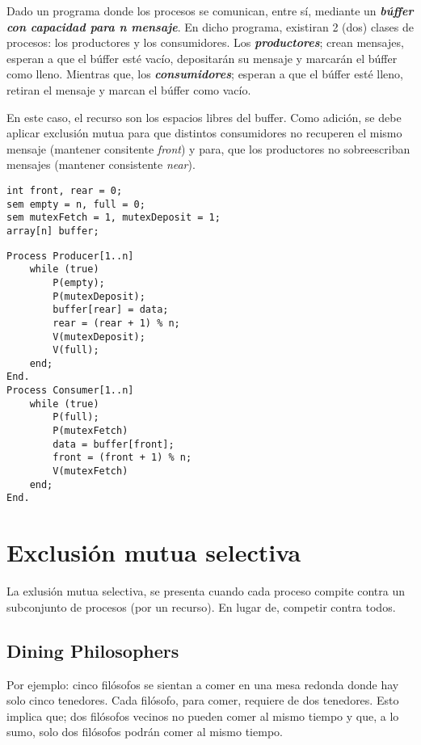 \documentclass[a4paper, 10pt]{report}
\begin{document}
Dado un programa donde los procesos se comunican, entre sí, mediante un \textbf{\emph{búffer con capacidad para n mensaje}}. En dicho programa, existiran 2 (dos) clases de procesos: los productores y los consumidores. Los \textbf{\emph{productores}}; crean mensajes, esperan a que el búffer esté vacío, depositarán su mensaje y marcarán el búffer como lleno. Mientras que, los \textbf{\emph{consumidores}}; esperan a que el búffer esté lleno, retiran el mensaje y marcan el búffer como vacío.

En este caso, el recurso son los espacios libres del buffer. Como adición, se debe aplicar exclusión mutua para que distintos consumidores no recuperen el mismo mensaje (mantener consitente \emph{front}) y para, que los productores no sobreescriban mensajes (mantener consistente \emph{near}).

\begin{lstlisting}
int front, rear = 0;
sem empty = n, full = 0;
sem mutexFetch = 1, mutexDeposit = 1;
array[n] buffer; 
\end{lstlisting}
\begin{minipage}{\linewidth} %
\begin{lstlisting}[multicols=2, firstnumber=5]
Process Producer[1..n]
	while (true)
		P(empty); 
		P(mutexDeposit);
		buffer[rear] = data;
		rear = (rear + 1) % n;
		V(mutexDeposit); 
		V(full);
	end;
End.
Process Consumer[1..n]
	while (true)
		P(full);
		P(mutexFetch)
		data = buffer[front];
		front = (front + 1) % n;
		V(mutexFetch)
	end;
End.
\end{lstlisting}	
\end{minipage}


\section{Exclusión mutua selectiva}

La exlusión mutua selectiva, se presenta cuando cada proceso compite contra un subconjunto de procesos (por un recurso). En lugar de, competir contra todos.

\subsection{Dining Philosophers}

Por ejemplo: cinco filósofos se sientan a comer en una mesa redonda donde hay solo cinco tenedores. Cada filósofo, para comer, requiere de dos tenedores. Esto implica que; dos filósofos vecinos no pueden comer al mismo tiempo y que, a lo sumo, solo dos filósofos podrán comer al mismo tiempo.
\end{document}

